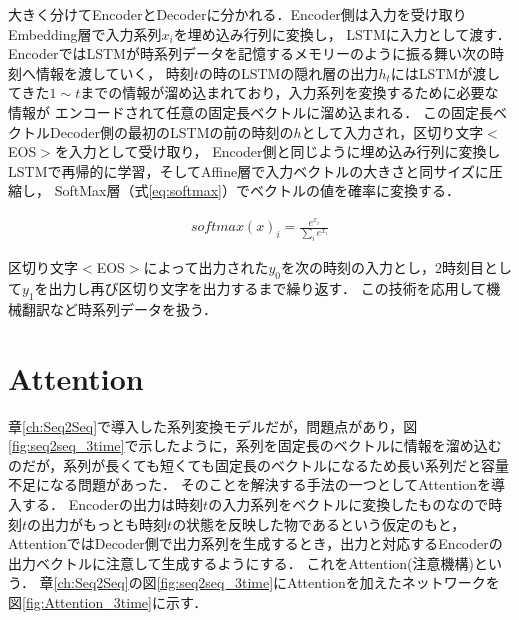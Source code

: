 \documentclass[a4j,11pt,report]{jsbook}
\begin{document}
大きく分けてEncoderとDecoderに分かれる．Encoder側は入力を受け取りEmbedding層で入力系列$x_{i}$を埋め込み行列に変換し，
LSTMに入力として渡す．EncoderではLSTMが時系列データを記憶するメモリーのように振る舞い次の時刻へ情報を渡していく，
時刻$t$の時のLSTMの隠れ層の出力$h_{t}$にはLSTMが渡してきた$1 \sim t$までの情報が溜め込まれており，入力系列を変換するために必要な情報が
エンコードされて任意の固定長ベクトルに溜め込まれる．
この固定長ベクトルDecoder側の最初のLSTMの前の時刻の$h$として入力され，区切り文字$<$EOS$>$を入力として受け取り，
Encoder側と同じように埋め込み行列に変換しLSTMで再帰的に学習，そしてAffine層で入力ベクトルの大きさと同サイズに圧縮し，
SoftMax層（式\ref{eq:softmax}）でベクトルの値を確率に変換する．

\begin{equation}
  \label{eq:softmax}
  \begin{split}
    softmax(x)_{i} = \frac{ e^{x_{i}} }{ \sum_{i} e^{x_{i}} }
  \end{split}
\end{equation}

区切り文字$<$EOS$>$によって出力された$y_{0}$を次の時刻の入力とし，$2$時刻目として$y_{1}$を出力し再び区切り文字を出力するまで繰り返す．
この技術を応用して機械翻訳など時系列データを扱う．

\chapter{Attention\label{ch:attention} }
章\ref{ch:Seq2Seq}で導入した系列変換モデルだが，問題点があり，図\ref{fig:seq2seq_3time}で示したように，系列を固定長のベクトルに情報を溜め込むのだが，系列が長くても短くても固定長のベクトルになるため長い系列だと容量不足になる問題があった．
そのことを解決する手法の一つとしてAttentionを導入する．
Encoderの出力は時刻$t$の入力系列をベクトルに変換したものなので時刻$t$の出力がもっとも時刻$t$の状態を反映した物であるという仮定のもと，
AttentionではDecoder側で出力系列を生成するとき，出力と対応するEncoderの出力ベクトルに注意して生成するようにする．
これをAttention(注意機構)という．
章\ref{ch:Seq2Seq}の図\ref{fig:seq2seq_3time}にAttentionを加えたネットワークを図\ref{fig:Attention_3time}に示す．
\end{document}
